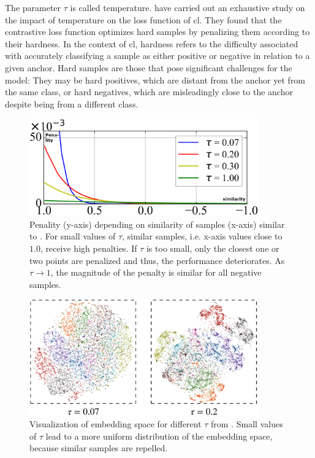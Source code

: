 The parameter $\tau$ is called temperature.
\citet{CL_temp_2021} have carried out an exhaustive study on the impact of temperature on the loss function of \ac{cl}.
They found that the contrastive loss function optimizes hard samples by penalizing them according to their hardness.
In the context of \ac{cl}, hardness refers to the difficulty associated with accurately classifying 
a sample as either positive or negative in relation to a given anchor.
Hard samples are those that pose significant challenges for the model: 
They may be hard positives, which are distant from the anchor yet from the same class, 
or hard negatives, which are misleadingly close to the anchor despite being from a different class.

\begin{figure}[!htb] %
    \centering
    \includegraphics[width=280pt]{images/gradient_ratio_dep_on_temperature_legend.png}
    \caption{Penality (y-axis) depending on similarity of samples (x-axis) similar to \citet{CL_temp_2021}. 
    For small values of $\tau$, similar samples, i.e. x-axis values close to $1.0$, receive high penalties.
    If $\tau$ is too small, only the closest one or two points are penalized and thus, the performance deteriorates.
    As $\tau \rightarrow 1$, the magnitude of the penalty is similar for all negative samples.
    }
    \label{fig:gradient_ratio_dep_on_temperature}
\end{figure}

\begin{figure}[!htb] %
    \centering
    \includegraphics[width=280pt]{images/tsne_dep_on_temperature.png}
    \caption{Visualization of embedding space for different $\tau$ from \citet{CL_temp_2021}.
    Small values of $\tau$ lead to a more uniform distribution of the embedding space, 
    because similar samples are repelled.
    }
    \label{fig:tsne_dep_on_temperature}
\end{figure}

